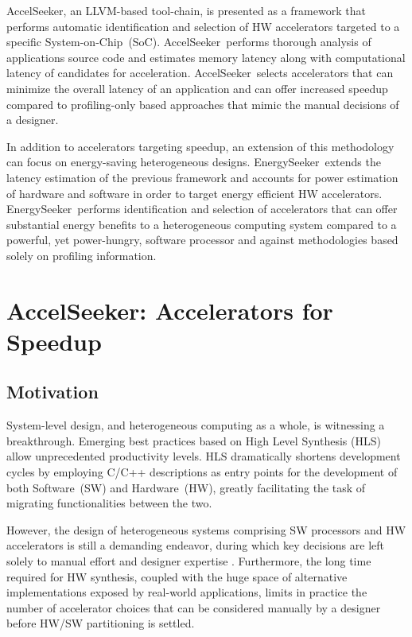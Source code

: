 \documentclass[]{usiinfthesis}
\newcommand{\aseeker}{{AccelSeeker}}
\newcommand{\eseeker}{{EnergySeeker}}
\newcommand{\HW}{{Hardware}}
\newcommand{\SW}{{Software}}
\newcommand{\SoC}{{System-on-Chip}}
\newcommand{\SoTA}{{state-of-the-art}}
\begin{document}
\aseeker, an LLVM-based tool-chain, is presented as a framework that performs automatic identification 
and selection of HW accelerators targeted to a specific \SoC\ (SoC).
\aseeker\ performs thorough analysis of applications source code and estimates memory latency along with 
computational latency of candidates for acceleration. \aseeker\ selects accelerators that can minimize the
overall latency of an application and can offer increased speedup compared to %
profiling-only based approaches that mimic the manual decisions of a designer.\par
In addition to accelerators targeting speedup, an extension of this methodology can focus on 
energy-saving 
heterogeneous designs. \eseeker\ extends the latency estimation of the previous framework and accounts for 
power estimation of hardware and software in order to target energy efficient HW accelerators. \eseeker\ 
performs identification and selection of accelerators that can offer substantial energy benefits to a 
heterogeneous computing system compared to a powerful, yet power-hungry, software processor and against  methodologies based solely on profiling information.

% 
%
%
%
%

\section{\aseeker: Accelerators for Speedup}

\subsection{Motivation}

System-level design, and heterogeneous computing as a whole, is witnessing a breakthrough. 
Emerging best practices based on High Level Synthesis (HLS) allow unprecedented productivity levels. 
HLS dramatically shortens development cycles by employing C/C++ descriptions as entry points 
for the development of both \SW\ (SW) and \HW\ (HW), greatly facilitating the task of migrating 
functionalities between the two.\par

However, the design of heterogeneous systems comprising SW processors and HW accelerators is 
still a demanding endeavor, during which key decisions are left solely to manual effort and 
designer expertise \cite{CacciottiSep18} \cite{NouriJun17}. Furthermore, the long time required 
for HW synthesis, coupled with the huge space of alternative implementations exposed by real-world 
applications, limits in practice the number of accelerator choices that can be considered manually 
by a designer before HW/SW partitioning is settled.\par
\end{document}
